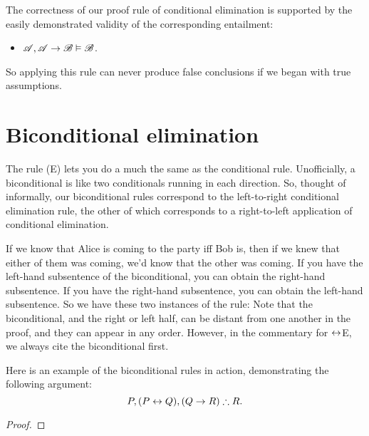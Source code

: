 The correctness of our proof rule of conditional elimination is supported by the easily demonstrated validity of the corresponding entailment: \begin{itemize}
	\item  $\mathscr{A}, \mathscr{A}\rightarrow\mathscr{B}\vDash \mathscr{B}$.
\end{itemize} So applying this rule can never produce false conclusions if we began with true assumptions.

\section{Biconditional elimination}\label{bielim}

The  rule ({\eiff}E) lets you do a much the same as the conditional rule. Unofficially, a biconditional is like two conditionals running in each direction. So, thought of informally, our biconditional rules correspond to the left-to-right conditional elimination rule, the other of which corresponds to a right-to-left application of conditional elimination. 

If we know that Alice is coming to the party iff Bob is, then if we knew that either of them was coming, we'd know that the other was coming. If you have the left-hand subsentence of the biconditional, you can obtain the right-hand subsentence. If you have the right-hand subsentence, you can obtain the left-hand subsentence. So we have these two instances of the rule:
Note that the biconditional, and the right or left half, can be distant from one another in the proof, and they can appear in any order. However, in the commentary for $\leftrightarrow$E, we always cite the biconditional first. 

Here is an example of the biconditional rules in action, demonstrating the following argument: $$P, (P\leftrightarrow Q), (Q \rightarrow R) \mathrel{\therefore} R.$$ \begin{proof}
	\open {}
	\open {}
\end{proof}

